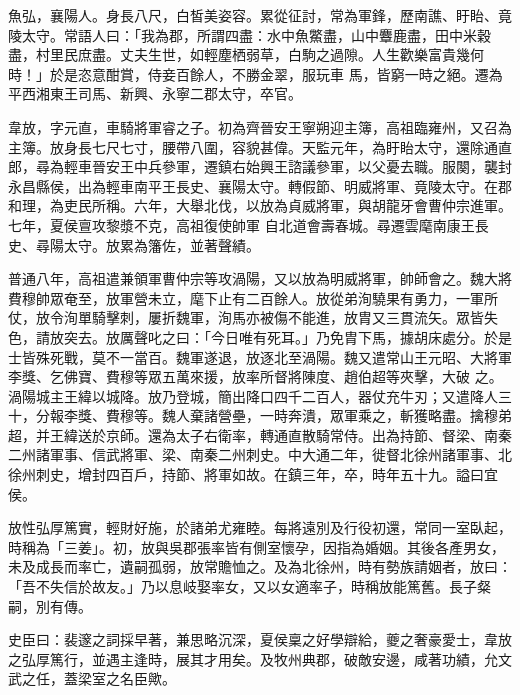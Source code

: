 \begin{pinyinscope}
 魚弘，襄陽人。身長八尺，白皙美姿容。累從征討，常為軍鋒，歷南譙、盱眙、竟陵太守。常語人曰：「我為郡，所謂四盡：水中魚鱉盡，山中麞鹿盡，田中米穀盡，村里民庶盡。丈夫生世，如輕塵栖弱草，白駒之過隙。人生歡樂富貴幾何時！」於是恣意酣賞，侍妾百餘人，不勝金翠，服玩車
 馬，皆窮一時之絕。遷為平西湘東王司馬、新興、永寧二郡太守，卒官。



 韋放，字元直，車騎將軍睿之子。初為齊晉安王寧朔迎主簿，高祖臨雍州，又召為主簿。放身長七尺七寸，腰帶八圍，容貌甚偉。天監元年，為盱眙太守，還除通直郎，尋為輕車晉安王中兵參軍，遷鎮右始興王諮議參軍，以父憂去職。服闋，襲封永昌縣侯，出為輕車南平王長史、襄陽太守。轉假節、明威將軍、竟陵太守。在郡和理，為吏民所稱。六年，大舉北伐，以放為貞威將軍，與胡龍牙會曹仲宗進軍。七年，夏侯亶攻黎漿不克，高祖復使帥軍
 自北道會壽春城。尋遷雲麾南康王長史、尋陽太守。放累為籓佐，並著聲績。



 普通八年，高祖遣兼領軍曹仲宗等攻渦陽，又以放為明威將軍，帥師會之。魏大將費穆帥眾奄至，放軍營未立，麾下止有二百餘人。放從弟洵驍果有勇力，一軍所仗，放令洵單騎擊刺，屢折魏軍，洵馬亦被傷不能進，放胄又三貫流矢。眾皆失色，請放突去。放厲聲叱之曰：「今日唯有死耳。」乃免胄下馬，據胡床處分。於是士皆殊死戰，莫不一當百。魏軍遂退，放逐北至渦陽。魏又遣常山王元昭、大將軍李獎、乞佛寶、費穆等眾五萬來援，放率所督將陳度、趙伯超等夾擊，大破
 之。渦陽城主王緯以城降。放乃登城，簡出降口四千二百人，器仗充牛刃；又遣降人三十，分報李獎、費穆等。魏人棄諸營壘，一時奔潰，眾軍乘之，斬獲略盡。擒穆弟超，并王緯送於京師。還為太子右衛率，轉通直散騎常侍。出為持節、督梁、南秦二州諸軍事、信武將軍、梁、南秦二州刺史。中大通二年，徙督北徐州諸軍事、北徐州刺史，增封四百戶，持節、將軍如故。在鎮三年，卒，時年五十九。謚曰宜侯。



 放性弘厚篤實，輕財好施，於諸弟尤雍睦。每將遠別及行役初還，常同一室臥起，時稱為「三姜」。初，放與吳郡張率皆有側室懷孕，因指為婚姻。其後各產男女，
 未及成長而率亡，遺嗣孤弱，放常贍恤之。及為北徐州，時有勢族請姻者，放曰：「吾不失信於故友。」乃以息岐娶率女，又以女適率子，時稱放能篤舊。長子粲嗣，別有傳。



 史臣曰：裴邃之詞採早著，兼思略沉深，夏侯稟之好學辯給，夔之奢豪愛士，韋放之弘厚篤行，並遇主逢時，展其才用矣。及牧州典郡，破敵安邊，咸著功績，允文武之任，蓋梁室之名臣歟。



\end{pinyinscope}